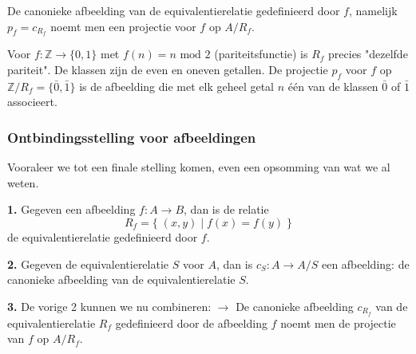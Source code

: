 De canonieke afbeelding van de equivalentierelatie gedefinieerd door $f$, namelijk $p_f = c_{R_f}$ noemt men een projectie voor $f$ op $A/R_f$.

\textbf{} Voor $f:\mathbb{Z} \to \{0,1\}$ met $f(n) = n \text{ mod } 2$ (pariteitsfunctie) is $R_f$ precies "dezelfde pariteit". De klassen zijn de even en oneven getallen. De projectie $p_f$ voor $f$ op $\mathbb{Z}/R_f = \{\bar{0}, \bar{1}\}$ is de afbeelding die met elk geheel getal $n$ één van de klassen $\bar{0}$ of $\bar{1}$ associeert.


\subsubsection{Ontbindingsstelling voor afbeeldingen}

Vooraleer we tot een finale stelling komen, even een opsomming van wat we al weten.

\textbf{1.} Gegeven een afbeelding $f : A \to B$, dan is de relatie
\begin{equation*}
    R_f = \{\; (x,y) \mid f(x) = f(y) \;\}
\end{equation*}
de equivalentierelatie gedefinieerd door $f$.

\begin{center}
\resizebox{0.55\textwidth}{!}{%
    
}
\end{center}

\textbf{2.} Gegeven de equivalentierelatie $S$ voor $A$, dan is $c_S : A \to A/S$ een afbeelding: de canonieke afbeelding van de equivalentierelatie $S$.

\begin{center}
\resizebox{0.75\textwidth}{!}{%
    
}
\end{center}

\textbf{3.} De vorige 2 kunnen we nu combineren:\newline
$\to$ De canonieke afbeelding $c_{R_f}$ van de equivalentierelatie $R_f$ gedefinieerd door de afbeelding $f$ noemt men de projectie van $f$ op $A/R_f$.

\begin{center}
\resizebox{0.65\textwidth}{!}{%
    
}
\end{center}

